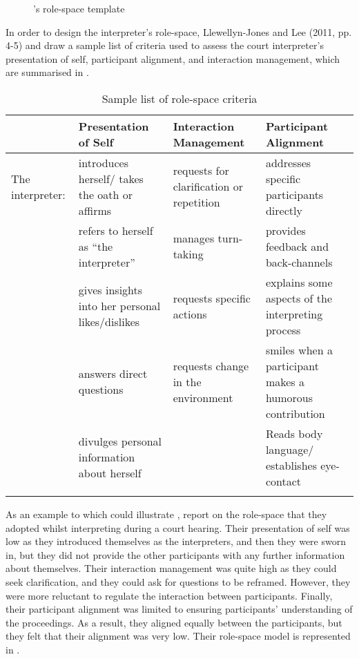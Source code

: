 \documentclass[output=paper]{langsci/langscibook}
\begin{document}
  

 

\begin{figure}
\caption{\citet{Llewellyn-Jones2014}'s role-space template\label{fig:devaux:1}}
\end{figure}

In order to design the interpreter’s role-space, Llewellyn-Jones and Lee (2011, pp. 4-5) and \citet[62]{Llewellyn-Jones2013} draw a sample list of criteria used to assess the court interpreter’s presentation of self, participant alignment, and interaction management, which are summarised in . 

\begin{table}
\begin{tabularx}{\textwidth}{XXXX}
\lsptoprule
& Presentation of Self & Interaction Management & Participant Alignment\\\midrule
 The interpreter: & introduces herself/ takes the oath or affirms & requests for clarification or repetition & addresses specific participants directly\\
& refers to herself as “the interpreter” & manages turn-taking & provides feedback and back-channels\\
& gives insights into her personal likes/dislikes & requests specific actions & explains some aspects of the interpreting process\\
& answers direct questions & requests change in the environment & smiles when a participant makes a humorous contribution\\
& divulges personal information about herself &  & Reads body language/ establishes eye-contact\\
\lspbottomrule
\end{tabularx}
\caption{\label{tab:devaux:1}Sample list of role-space criteria}
\end{table}

As an example to which could illustrate , \citet[77-78]{Llewellyn-Jones2014} report on the role-space that they adopted whilst interpreting during a court hearing. Their presentation of self was low as they introduced themselves as the interpreters, and then they were sworn in, but they did not provide the other participants with any further information about themselves. Their interaction management was quite high as they could seek clarification, and they could ask for questions to be reframed. However, they were more reluctant to regulate the interaction between participants. Finally, their participant alignment was limited to ensuring participants’ understanding of the proceedings. As a result, they aligned equally between the participants, but they felt that their alignment was very low. Their role-space model is represented in . 
\end{document}
